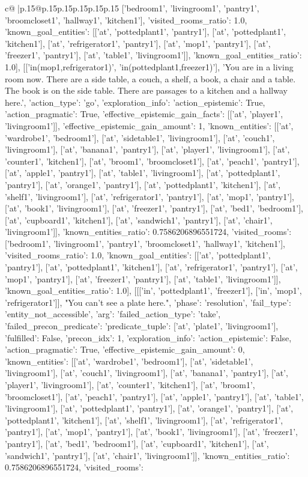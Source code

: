 \documentclass{article}
\begin{document}
{\begin{supertabular}{c@{$\;$}|p{.15\linewidth}@{}p{.15\linewidth}p{.15\linewidth}p{.15\linewidth}p{.15\linewidth}p{.15\linewidth}}
{{{['bedroom1', 'livingroom1', 'pantry1', 'broomcloset1', 'hallway1', 'kitchen1'], 'visited_rooms_ratio': 1.0, 'known_goal_entities': [['at', 'pottedplant1', 'pantry1'], ['at', 'pottedplant1', 'kitchen1'], ['at', 'refrigerator1', 'pantry1'], ['at', 'mop1', 'pantry1'], ['at', 'freezer1', 'pantry1'], ['at', 'table1', 'livingroom1']], 'known_goal_entities_ratio': 1.0}}], [['in(mop1,refrigerator1)', 'in(pottedplant1,freezer1)'], 'You are in a living room now. There are a side table, a couch, a shelf, a book, a chair and a table. The book is on the side table. There are passages to a kitchen and a hallway here.', {'action_type': 'go', 'exploration_info': {'action_epistemic': True, 'action_pragmatic': True, 'effective_epistemic_gain_facts': [['at', 'player1', 'livingroom1']], 'effective_epistemic_gain_amount': 1, 'known_entities': [['at', 'wardrobe1', 'bedroom1'], ['at', 'sidetable1', 'livingroom1'], ['at', 'couch1', 'livingroom1'], ['at', 'banana1', 'pantry1'], ['at', 'player1', 'livingroom1'], ['at', 'counter1', 'kitchen1'], ['at', 'broom1', 'broomcloset1'], ['at', 'peach1', 'pantry1'], ['at', 'apple1', 'pantry1'], ['at', 'table1', 'livingroom1'], ['at', 'pottedplant1', 'pantry1'], ['at', 'orange1', 'pantry1'], ['at', 'pottedplant1', 'kitchen1'], ['at', 'shelf1', 'livingroom1'], ['at', 'refrigerator1', 'pantry1'], ['at', 'mop1', 'pantry1'], ['at', 'book1', 'livingroom1'], ['at', 'freezer1', 'pantry1'], ['at', 'bed1', 'bedroom1'], ['at', 'cupboard1', 'kitchen1'], ['at', 'sandwich1', 'pantry1'], ['at', 'chair1', 'livingroom1']], 'known_entities_ratio': 0.7586206896551724, 'visited_rooms': ['bedroom1', 'livingroom1', 'pantry1', 'broomcloset1', 'hallway1', 'kitchen1'], 'visited_rooms_ratio': 1.0, 'known_goal_entities': [['at', 'pottedplant1', 'pantry1'], ['at', 'pottedplant1', 'kitchen1'], ['at', 'refrigerator1', 'pantry1'], ['at', 'mop1', 'pantry1'], ['at', 'freezer1', 'pantry1'], ['at', 'table1', 'livingroom1']], 'known_goal_entities_ratio': 1.0}}], [[['in', 'pottedplant1', 'freezer1'], ['in', 'mop1', 'refrigerator1']], "You can't see a plate here.", {'phase': 'resolution', 'fail_type': 'entity_not_accessible', 'arg': {'failed_action_type': 'take', 'failed_precon_predicate': {'predicate_tuple': ['at', 'plate1', 'livingroom1'], 'fulfilled': False, 'precon_idx': 1}}, 'exploration_info': {'action_epistemic': False, 'action_pragmatic': True, 'effective_epistemic_gain_amount': 0, 'known_entities': [['at', 'wardrobe1', 'bedroom1'], ['at', 'sidetable1', 'livingroom1'], ['at', 'couch1', 'livingroom1'], ['at', 'banana1', 'pantry1'], ['at', 'player1', 'livingroom1'], ['at', 'counter1', 'kitchen1'], ['at', 'broom1', 'broomcloset1'], ['at', 'peach1', 'pantry1'], ['at', 'apple1', 'pantry1'], ['at', 'table1', 'livingroom1'], ['at', 'pottedplant1', 'pantry1'], ['at', 'orange1', 'pantry1'], ['at', 'pottedplant1', 'kitchen1'], ['at', 'shelf1', 'livingroom1'], ['at', 'refrigerator1', 'pantry1'], ['at', 'mop1', 'pantry1'], ['at', 'book1', 'livingroom1'], ['at', 'freezer1', 'pantry1'], ['at', 'bed1', 'bedroom1'], ['at', 'cupboard1', 'kitchen1'], ['at', 'sandwich1', 'pantry1'], ['at', 'chair1', 'livingroom1']], 'known_entities_ratio': 0.7586206896551724, 'visited_rooms': }}}
\end{supertabular}}
\end{document}
